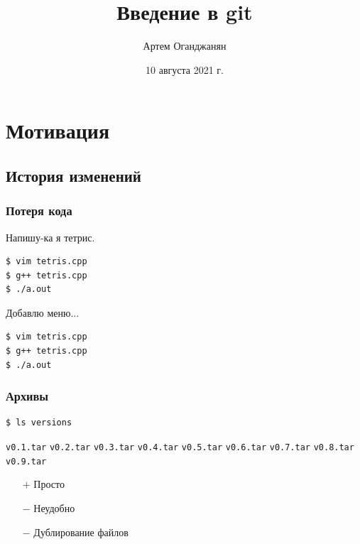 \documentclass[pdf,russian,aspectratio=169]{beamer}
\title{Введение в git}
\author{Артем Оганджанян}
\institute{ЛОЛ-2021}
\date{10 августа 2021 г.}
\begin{document}

\begin{frame}
    \titlepage
\end{frame}

\section{Мотивация}

\subsection{История изменений}

\begin{frame}[fragile]
    \frametitle{Потеря кода}
    \pause
    Напишу-ка я тетрис.
    \begin{block}{}
        \begin{verbatim}
$ vim tetris.cpp
$ g++ tetris.cpp
$ ./a.out
        \end{verbatim}
    \end{block}
    \pause
    Добавлю меню...
    \begin{block}{}
        \begin{verbatim}
$ vim tetris.cpp
$ g++ tetris.cpp
$ ./a.out
        \end{verbatim}
    \end{block}
    \pause
\end{frame}

\begin{frame}[fragile]
    \frametitle{Архивы}
    \begin{block}{}
        \begin{verbatim}
$ ls versions
        \end{verbatim}
        \texttt{\textcolor[HTML]{aa0000}{v0.1.tar}} \quad
        \texttt{\textcolor[HTML]{aa0000}{v0.2.tar}} \quad
        \pause
        \texttt{\textcolor[HTML]{aa0000}{v0.3.tar}} \quad
        \texttt{\textcolor[HTML]{aa0000}{v0.4.tar}} \quad
        \texttt{\textcolor[HTML]{aa0000}{v0.5.tar}} \quad
        \texttt{\textcolor[HTML]{aa0000}{v0.6.tar}} \quad
        \texttt{\textcolor[HTML]{aa0000}{v0.7.tar}} \quad
        \texttt{\textcolor[HTML]{aa0000}{v0.8.tar}} \quad
        \texttt{\textcolor[HTML]{aa0000}{v0.9.tar}}
    \end{block}
    \begin{itemize}
        \pause
        \item[$+$] Просто
        \pause
        \item[$-$] Неудобно
        \pause
        \item[$-$] Дублирование файлов
    \end{itemize}
\end{frame}
\end{document}
